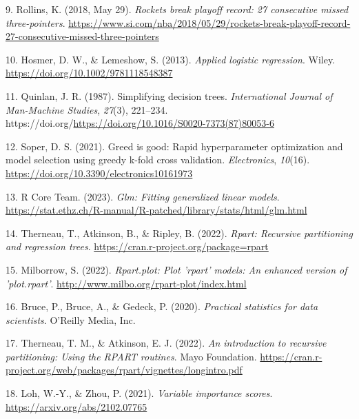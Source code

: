 \documentclass[
  12pt,
  a4paper,
]{article}
\newlength{\cslhangindent}
\newlength{\cslentryspacingunit} %
\newenvironment{CSLReferences}[2] %
 {%
  \setlength{\parindent}{0pt}
  \ifodd #1
  \let\oldpar\par
  \def\par{\hangindent=\cslhangindent\oldpar}
  \fi
  \setlength{\parskip}{#2\cslentryspacingunit}
 }%
 {}
\begin{document}
\begin{CSLReferences}{1}{0}
\leavevmode{}%
9. Rollins, K. (2018, May 29). \emph{Rockets break playoff record: 27 consecutive missed three-pointers}. \url{https://www.si.com/nba/2018/05/29/rockets-break-playoff-record-27-consecutive-missed-three-pointers}

\leavevmode{}%
10. Hosmer, D. W., \& Lemeshow, S. (2013). \emph{Applied logistic regression}. Wiley. \url{https://doi.org/10.1002/9781118548387}

\leavevmode{}%
11. Quinlan, J. R. (1987). Simplifying decision trees. \emph{International Journal of Man-Machine Studies}, \emph{27}(3), 221--234. https://doi.org/\url{https://doi.org/10.1016/S0020-7373(87)80053-6}

\leavevmode{}%
12. Soper, D. S. (2021). Greed is good: Rapid hyperparameter optimization and model selection using greedy k-fold cross validation. \emph{Electronics}, \emph{10}(16). \url{https://doi.org/10.3390/electronics10161973}

\leavevmode{}%
13. R Core Team. (2023). \emph{Glm: Fitting generalized linear models}. \url{https://stat.ethz.ch/R-manual/R-patched/library/stats/html/glm.html}

\leavevmode{}%
14. Therneau, T., Atkinson, B., \& Ripley, B. (2022). \emph{Rpart: Recursive partitioning and regression trees}. \url{https://cran.r-project.org/package=rpart}

\leavevmode{}%
15. Milborrow, S. (2022). \emph{Rpart.plot: Plot 'rpart' models: An enhanced version of 'plot.rpart'}. \url{http://www.milbo.org/rpart-plot/index.html}

\leavevmode{}%
16. Bruce, P., Bruce, A., \& Gedeck, P. (2020). \emph{Practical statistics for data scientists}. O'Reilly Media, Inc.

\leavevmode{}%
17. Therneau, T. M., \& Atkinson, E. J. (2022). \emph{An introduction to recursive partitioning: Using the RPART routines}. Mayo Foundation. \url{https://cran.r-project.org/web/packages/rpart/vignettes/longintro.pdf}

\leavevmode{}%
18. Loh, W.-Y., \& Zhou, P. (2021). \emph{Variable importance scores}. \url{https://arxiv.org/abs/2102.07765}


\end{CSLReferences}
\end{document}
